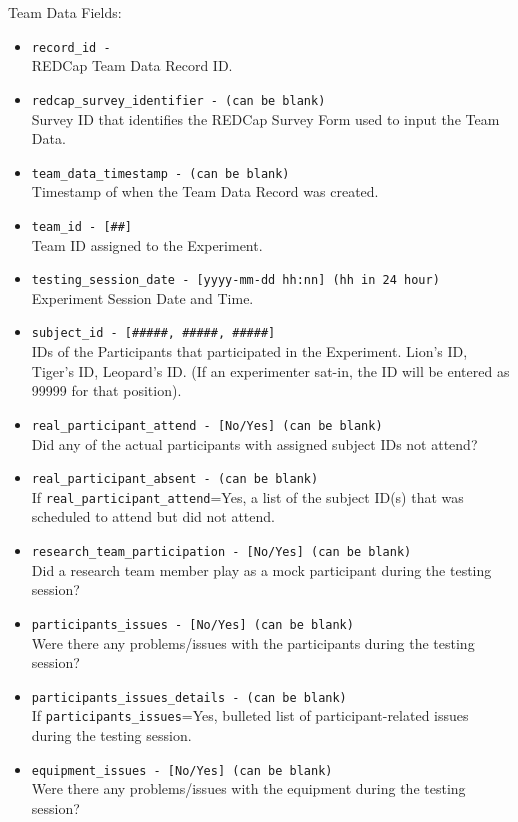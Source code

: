 \begin{description}
Team Data Fields:
\begin{itemize}
    \item \verb|record_id -|\\REDCap Team Data Record ID.
    \item \verb|redcap_survey_identifier - (can be blank)|\\Survey ID that identifies the REDCap Survey Form used to input the Team Data.
    \item \verb|team_data_timestamp - (can be blank)|\\Timestamp of when the Team Data Record was created.
    \item \verb|team_id - [##]|\\Team ID assigned to the Experiment.
    \item \verb|testing_session_date - [yyyy-mm-dd hh:nn] (hh in 24 hour)|\\Experiment Session Date and Time.
    \item \verb|subject_id - [#####, #####, #####]|\\IDs of the Participants that participated in the Experiment. Lion's ID, Tiger's ID, Leopard's ID. (If an experimenter sat-in, the ID will be entered as 99999 for that position).
    \item \verb|real_participant_attend - [No/Yes] (can be blank)|\\Did any of the actual participants with assigned subject IDs not attend?
    \item \verb|real_participant_absent - (can be blank)|\\If \verb|real_participant_attend|=Yes, a list of the subject ID(s) that was scheduled to attend but did not attend.
    \item \verb|research_team_participation - [No/Yes] (can be blank)|\\Did a research team member play as a mock participant during the testing session?
    \item \verb|participants_issues - [No/Yes] (can be blank)|\\Were there any problems/issues with the participants during the testing session?
    \item \verb|participants_issues_details - (can be blank)|\\If \verb|participants_issues|=Yes, bulleted list of participant-related issues during the testing session.
    \item \verb|equipment_issues - [No/Yes] (can be blank)|\\Were there any problems/issues with the equipment during the testing session?

\end{itemize}
\end{description}

